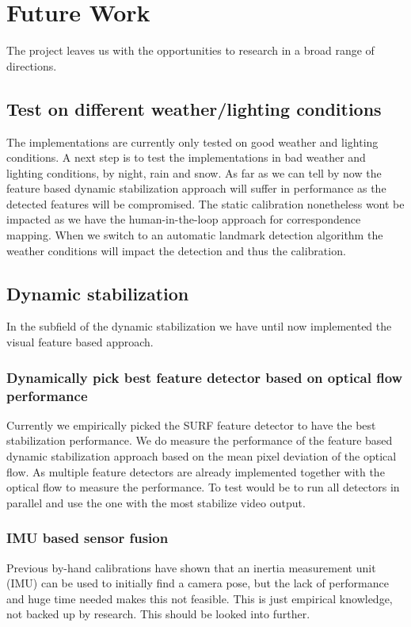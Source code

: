 
\section{Future Work}
The project leaves us with the opportunities to research in a broad range of directions.

\subsection{Test on different weather/lighting conditions}
The implementations are currently only tested on good weather and lighting conditions. 
A next step is to test the implementations in bad weather and lighting conditions, \eg by night, rain and snow.
As far as we can tell by now the feature based dynamic stabilization approach will suffer in performance as the detected features will be compromised.
The static calibration nonetheless wont be impacted as we have the human-in-the-loop approach for correspondence mapping. 
When we switch to an automatic landmark detection algorithm the weather conditions will impact the detection and thus the calibration.

\subsection{Dynamic stabilization}
In the subfield of the dynamic stabilization we have until now implemented the visual feature based approach.

\subsubsection{Dynamically pick best feature detector based on optical flow performance}
Currently we empirically picked the SURF feature detector to have the best stabilization performance.
We do measure the performance of the feature based dynamic stabilization approach based on the mean pixel deviation of the optical flow.
As multiple feature detectors are already implemented together with the optical flow to measure the performance.
To test would be to run all detectors in parallel and use the one with the most stabilize video output.

\subsubsection{IMU based sensor fusion}
Previous by-hand calibrations have shown that an inertia measurement unit (IMU) can be used to initially find a camera pose, but the lack of performance and huge time needed makes this not feasible.
This is just empirical knowledge, not backed up by research. 
This should be looked into further.

